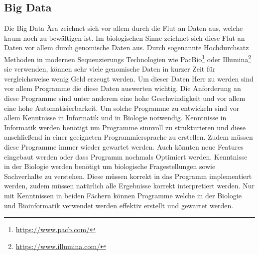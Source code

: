 \documentclass{scrartcl}
\begin{document}
\subsection{Big Data}
\label{sec-2-2}
Die Big Data Ära zeichnet sich vor allem durch die Flut an Daten aus, welche kaum noch zu bewältigen ist. Im biologischen Sinne zeichnet sich diese 
Flut an Daten vor allem durch genomische Daten aus. Durch sogenannte Hochdurchsatz Methoden in modernen Sequenzierungs Technologien wie PacBio\footnote{\url{https://www.pacb.com/}} oder Illumina\footnote{\url{https://www.illumina.com/}}
sie verwenden, können sehr viele genomische Daten in kurzer Zeit für vergleichsweise wenig Geld erzeugt werden. Um dieser Daten Herr zu werden sind vor allem
Programme die diese Daten auswerten wichtig. Die Anforderung an diese Programme sind unter anderem eine hohe Geschwindigkeit und vor allem eine hohe 
Automatisierbarkeit. Um solche Programme zu entwickeln sind vor allem Kenntnisse in Informatik und in Biologie notwendig. Kenntnisse in Informatik
werden benötigt um Programme sinnvoll zu strukturieren und diese anschließend in einer geeigneten Programmiersprache zu erstellen. Zudem müssen diese
Programme immer wieder gewartet werden. Auch könnten neue Features eingebaut werden oder dass Programm nochmals Optimiert werden. Kenntnisse in der Biologie
werden benötigt um biologische Fragestellungen sowie Sachverhalte zu verstehen. Diese müssen korrekt in das Programm implementiert werden, zudem müssen 
natürlich alle Ergebnisse korrekt interpretiert werden. Nur mit Kenntnissen in beiden Fächern können Programme welche in der Biologie und Bioinformatik verwendet
werden effektiv erstellt und gewartet werden.  
\end{document}
